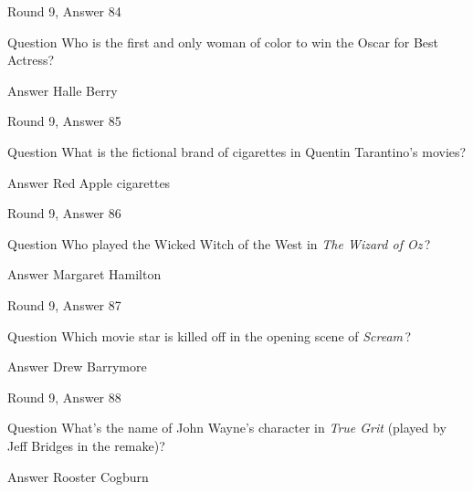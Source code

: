 \documentclass[11pt]{beamer}
\begin{document}
\begin{frame}[t]{Round 9, Answer 84}
\vspace{2em}
\begin{block}{Question}
Who is the first and only woman of color to win the Oscar for Best Actress?
\end{block}
\pause{}
\begin{block}{Answer}
Halle Berry
\end{block}
\end{frame}
    

\begin{frame}[t]{Round 9, Answer 85}
\vspace{2em}
\begin{block}{Question}
What is the fictional brand of cigarettes in Quentin Tarantino's movies?
\end{block}
\pause{}
\begin{block}{Answer}
Red Apple cigarettes
\end{block}
\end{frame}
    

\begin{frame}[t]{Round 9, Answer 86}
\vspace{2em}
\begin{block}{Question}
Who played the Wicked Witch of the West in \emph{The Wizard of Oz}\,?
\end{block}
\pause{}
\begin{block}{Answer}
Margaret Hamilton
\end{block}
\end{frame}
    

\begin{frame}[t]{Round 9, Answer 87}
\vspace{2em}
\begin{block}{Question}
Which movie star is killed off in the opening scene of \emph{Scream}\,?
\end{block}
\pause{}
\begin{block}{Answer}
Drew Barrymore
\end{block}
\end{frame}
    

\begin{frame}[t]{Round 9, Answer 88}
\vspace{2em}
\begin{block}{Question}
What's the name of John Wayne's character in \emph{True Grit} (played by Jeff Bridges in the remake)?
\end{block}
\pause{}
\begin{block}{Answer}
Rooster Cogburn
\end{block}
\end{frame}
    
\end{document}
